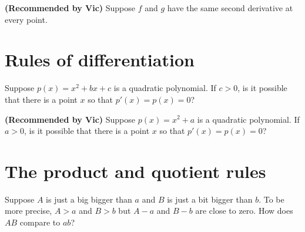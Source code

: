 \documentclass{ximera}
\newcommand{\recommendation}[1]{\textbf{(Recommended by #1)}}
\begin{document}
\begin{problem}
\recommendation{Vic}
  Suppose $f$ and $g$ have the same second derivative at every point.  
  \begin{multipleChoice}
  \end{multipleChoice}
\end{problem}

\clearpage

\section{Rules of differentiation}

\begin{problem}
  Suppose $p(x) = x^2 + bx + c$ is a quadratic polynomial.  If $c > 0$, is it possible that there is a point $x$ so that $p'(x) = p(x) = 0$?
  \begin{multipleChoice}
  \end{multipleChoice}
\end{problem}

\begin{problem}
\recommendation{Vic}
  Suppose $p(x) = x^2 + a$ is a quadratic polynomial.  If $a > 0$, is it possible that there is a point $x$ so that $p'(x) = p(x) = 0$?
  \begin{multipleChoice}
  \end{multipleChoice}
\end{problem}

\clearpage

\section{The product and quotient rules}

\begin{problem}
  Suppose $A$ is just a big bigger than $a$ and $B$ is just a bit
  bigger than $b$.  To be more precise, $A > a$ and $B > b$ but
  $A - a$ and $B-b$ are close to zero.  How does $AB$ compare to $ab$?
  \begin{multipleChoice}
  \end{multipleChoice}
\end{problem}
\end{document}
